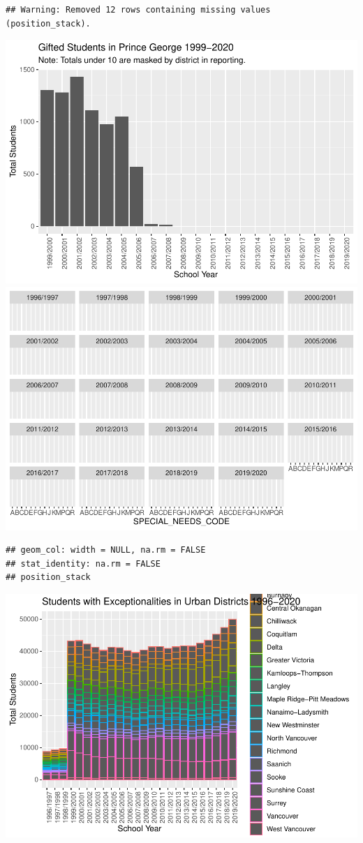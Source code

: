 \documentclass[
  english,
  man]{apa6}
\begin{document}
\begin{verbatim}
## Warning: Removed 12 rows containing missing values (position_stack).
\end{verbatim}

\includegraphics{draft_play_files/figure-latex/rural play-4.pdf} \includegraphics{draft_play_files/figure-latex/rural play-5.pdf}

\begin{verbatim}
## geom_col: width = NULL, na.rm = FALSE
## stat_identity: na.rm = FALSE
## position_stack
\end{verbatim}

\includegraphics{draft_play_files/figure-latex/urban play-1.pdf}
\end{document}

